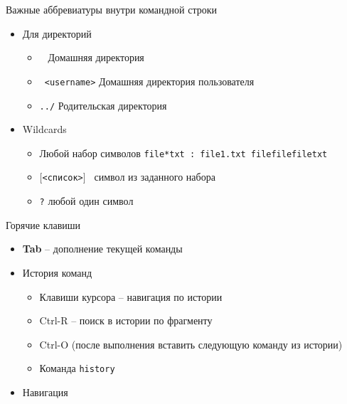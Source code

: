 \documentclass[ignorenonframetext, professionalfonts, hyperref={pdftex, unicode}]{beamer}
\begin{document}
\begin{frame}{Важные аббревиатуры внутри командной строки}
  \begin{itemize}
    \item Для директорий
    \begin{itemize}
      \item {\tt ~} Домашняя директория
      \item {\tt ~<username>} Домашняя директория пользователя
      \item {\tt ../} Родительская директория
    \end{itemize}
  \pause  
  \item Wildcards
    \begin{itemize}
      \item {\tt *} Любой набор символов {\tt file*txt : file1.txt filefilefiletxt}
      \item {\tt $[$<список>$]$ } символ из заданного набора {\tt }
      \item {\tt ?} любой один символ
     \end{itemize}

  \end{itemize}
\end{frame}       
\begin{frame}{Горячие клавиши}
  \begin{itemize}
    \item \textbf{Tab} -- дополнение текущей команды
     \pause
    \item История команд
      \begin{itemize}
        \item Клавиши курсора -- навигация по истории
        \item Ctrl-R -- поиск в истории по фрагменту
        \item Ctrl-O (после выполнения вставить следующую команду из истории)
        \item Команда {\tt history}
       \end{itemize}
    \item Навигация
   \end{itemize}
\end{frame}
\end{document}
